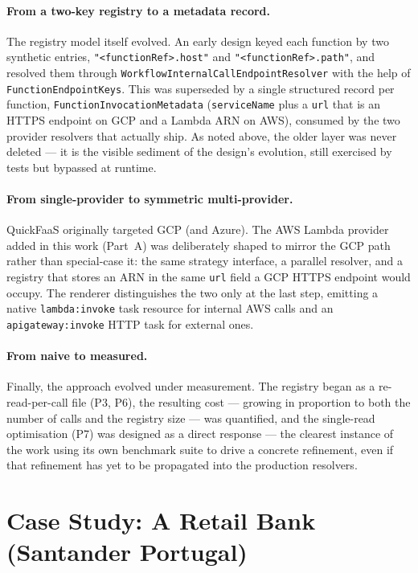\paragraph{From a two-key registry to a metadata record.}
The registry model itself evolved. An early design keyed each function by two synthetic entries,
\texttt{"<functionRef>.host"} and \texttt{"<functionRef>.path"}, and resolved them through
\texttt{WorkflowInternalCallEndpointResolver} with the help of \texttt{FunctionEndpointKeys}.
This was superseded by a single structured record per function,
\texttt{FunctionInvocationMetadata} (\texttt{serviceName} plus a \texttt{url} that is an HTTPS
endpoint on GCP and a Lambda ARN on AWS), consumed by the two provider resolvers that actually
ship. As noted above, the older layer was never deleted --- it is the visible sediment of the
design's evolution, still exercised by tests but bypassed at runtime.

\paragraph{From single-provider to symmetric multi-provider.}
QuickFaaS originally targeted GCP (and Azure). The AWS Lambda provider added in this work
(Part~A) was deliberately shaped to mirror the GCP path rather than special-case it: the same
strategy interface, a parallel resolver, and a registry that stores an ARN in the same
\texttt{url} field a GCP HTTPS endpoint would occupy. The renderer distinguishes the two only at
the last step, emitting a native \texttt{lambda:invoke} task resource for internal AWS calls and
an \texttt{apigateway:invoke} HTTP task for external ones.

\paragraph{From naive to measured.}
Finally, the approach evolved under measurement. The registry began as a re-read-per-call file
(P3, P6), the resulting cost --- growing in proportion to both the number of calls and the
registry size --- was quantified, and the single-read optimisation
(P7) was designed as a direct response --- the clearest instance of the work using its own
benchmark suite to drive a concrete refinement, even if that refinement has yet to be
propagated into the production resolvers.

\section{Case Study: A Retail Bank (Santander Portugal)}
\label{sec:case-study-bank}

